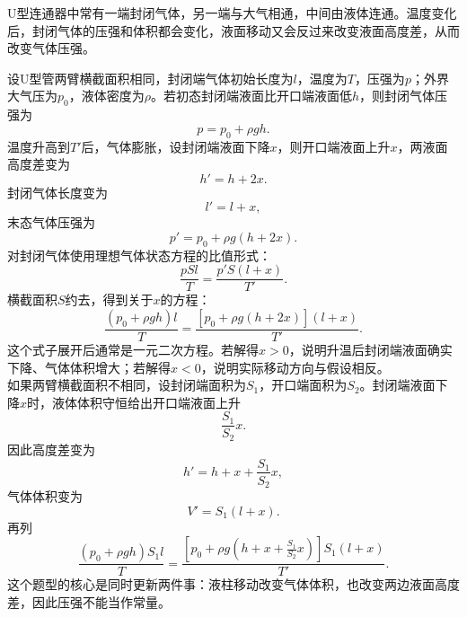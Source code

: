 \begin{casetypebox}[title={\strut\textcolor{white}{\bfseries 常见题型：U型连通器中气体受热}}]
U型连通器中常有一端封闭气体，另一端与大气相通，中间由液体连通。温度变化后，封闭气体的压强和体积都会变化，液面移动又会反过来改变液面高度差，从而改变气体压强。\\
\begin{center}
\end{center}
设U型管两臂横截面积相同，封闭端气体初始长度为$l$，温度为$T$，压强为$p$；外界大气压为$p_0$，液体密度为$\rho$。若初态封闭端液面比开口端液面低$h$，则封闭气体压强为
\[
  p=p_0+\rho gh.
\]
温度升高到$T'$后，气体膨胀，设封闭端液面下降$x$，则开口端液面上升$x$，两液面高度差变为
\[
  h'=h+2x.
\]
封闭气体长度变为
\[
  l'=l+x,
\]
末态气体压强为
\[
  p'=p_0+\rho g(h+2x).
\]
对封闭气体使用理想气体状态方程的比值形式：
\[
  \frac{pSl}{T}=\frac{p'S(l+x)}{T'}.
\]
横截面积$S$约去，得到关于$x$的方程：
\[
  \frac{(p_0+\rho gh)l}{T}
  =
  \frac{\left[p_0+\rho g(h+2x)\right](l+x)}{T'}.
\]
这个式子展开后通常是一元二次方程。若解得$x>0$，说明升温后封闭端液面确实下降、气体体积增大；若解得$x<0$，说明实际移动方向与假设相反。\\
如果两臂横截面积不相同，设封闭端面积为$S_1$，开口端面积为$S_2$。封闭端液面下降$x$时，液体体积守恒给出开口端液面上升
\[
  \frac{S_1}{S_2}x.
\]
因此高度差变为
\[
  h'=h+x+\frac{S_1}{S_2}x,
\]
气体体积变为
\[
  V'=S_1(l+x).
\]
再列
\[
  \frac{(p_0+\rho gh)S_1l}{T}
  =
  \frac{\left[p_0+\rho g\left(h+x+\frac{S_1}{S_2}x\right)\right]S_1(l+x)}{T'}.
\]
这个题型的核心是同时更新两件事：液柱移动改变气体体积，也改变两边液面高度差，因此压强不能当作常量。
\end{casetypebox}

